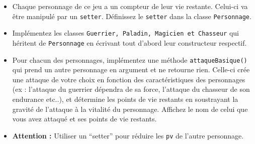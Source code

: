 \begin{Exercice}[15 minutes]
\begin{itemize}
        \item Chaque personnage de ce jeu a un compteur de leur vie restante. Celui-ci va être manipulé par un \lstinline{setter}. Définissez le \lstinline{setter} dans la classe \lstinline{Personnage}.
        \item Implémentez les classes \lstinline{Guerrier, Paladin, Magicien et Chasseur} qui héritent de \lstinline{Personnage} en écrivant tout d’abord leur constructeur respectif. 
        
        
    
        \item Pour chacun des personnages, implémentez une méthode \lstinline{attaqueBasique()} qui prend un autre personnage en argument et ne retourne rien. Celle-ci crée une attaque de votre choix en fonction des caractéristiques des personnages (ex : l’attaque du guerrier dépendra de sa force, l’attaque du chasseur de son endurance etc..), et détermine les points de vie restants en soustrayant la gravité de l'attaque à la vitalité du personnage. Affichez le nom de celui que vous avez attaqué et ses points de vie restants.
        \item \textbf{Attention :} Utiliser un ``setter'' pour réduire les \lstinline{pv} de l’autre personnage.
        
        
    \end{itemize}
    
    \begin{solution}
        
    \end{solution}
    \begin{solution}
        
    \end{solution}
    
    \begin{solution}
        
    \end{solution}
    \begin{solution}
        
    \end{solution}
    \end{Exercice}
    
  
    

